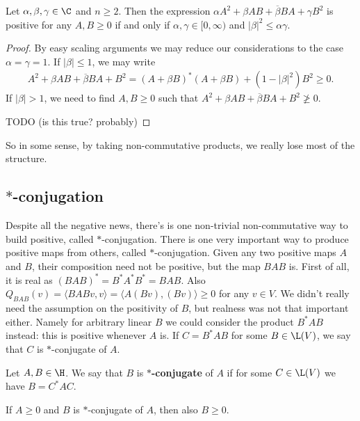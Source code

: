 \begin{prop}\label{symmetric_fail}
	Let $\alpha, \beta, \gamma \in \C$ and $n \geq 2$. Then the expression $\alpha A^{2} + \beta AB + \overline{\beta} BA + \gamma B^{2}$ is positive for any $A, B \geq 0$ if and only if $\alpha, \gamma \in [0, \infty)$ and $|\beta|^{2} \leq \alpha \gamma$.
\end{prop}
\begin{proof}
	By easy scaling arguments we may reduce our considerations to the case $\alpha = \gamma = 1$. If $|\beta| \leq 1$, we may write
	\begin{align*}
		A^2 + \beta A B + \overline{\beta} B A + B^2 = (A + \beta B)^{*}(A + \beta B) + (1 - |\beta|^2) B^2 \geq 0.
	\end{align*}
	If $|\beta| > 1$, we need to find $A, B \geq 0$ such that $A^2 + \beta A B + \overline{\beta} B A + B^2 \not\geq 0$.

	TODO (is this true? probably)
\end{proof}

So in some sense, by taking non-commutative products, we really lose most of the structure.

\subsection{$*$-conjugation}

Despite all the negative news, there's is one non-trivial non-commutative way to build positive, called $*$-conjugation. There is one very important way to produce positive maps from others, called $*$-conjugation. Given any two positive maps $A$ and $B$, their composition need not be positive, but the map $BAB$ is. First of all, it is real as $(BAB)^{*} = B^{*} A^{*} B^{*} = BAB$. Also $Q_{BAB}(v) = \langle BAB v, v \rangle = \langle A (B v), (B v) \rangle \geq 0$ for any $v \in V$. We didn't really need the assumption on the positivity of $B$, but realness was not that important either. Namely for arbitrary linear $B$ we could consider the product $B^{*}AB$ instead: this is positive whenever $A$ is. If $C = B^{*}AB$ for some $B \in \L(V)$, we say that $C$ is $*$-conjugate of $A$.

\begin{maar}
	Let $A, B \in \H$. We say that $B$ is \textbf{$*$-conjugate} of $A$ if for some $C \in \L(V)$ we have $B = C^{*} A C$.
\end{maar}

\begin{prop}
	If $A \geq 0$ and $B$ is $*$-conjugate of $A$, then also $B \geq 0$.
\end{prop}

